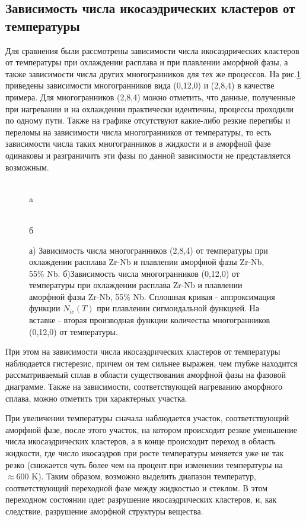 \subsection{Зависимость числа икосаэдрических кластеров от температуры}
Для сравнения были рассмотрены  зависимости  числа икосаэдрических кластеров от температуры при охлаждении расплава и при плавлении аморфной фазы, а также зависимости числа других многогранников для тех же процессов. На  рис.\ref{0120_284}  приведены зависимости многогранников вида (0,12,0) и  (2,8,4) в качестве примера. Для многогранников (2,8,4) можно отметить, что данные, полученные при нагревании и на охлаждении практически идентичны, процессы проходили по одному пути. Также на графике отсутствуют какие-либо резкие перегибы и переломы на зависимости числа многогранников от температуры, то есть зависимости числа таких многогранников в жидкости и в аморфной фазе одинаковы и разграничить эти фазы по данной зависимости не представляется возможным.
\begin{figure}[h!]
	\begin{center}
		\begin{minipage}[h]{0.6\linewidth}
			 \\a 
		\end{minipage}
		\hfill
		\begin{minipage}[h]{0.6\linewidth}
			 \\б
		\end{minipage}
		\caption{а) Зависимость числа многогранников (2,8,4)  от температуры при охлаждении расплава Zr-Nb и плавлении аморфной фазы Zr-Nb, 55\% Nb. 
			б)Зависимость числа многогранников (0,12,0) от температуры при охлаждении расплава Zr-Nb и плавлении аморфной фазы Zr-Nb, 55\% Nb. Сплошная кривая - аппроксимация функции $N_{ic}(T)$ при плавлении сигмоидальной функцией. На вставке - вторая производная функции количества многогранников (0,12,0) от температуры.}
		\label{0120_284}
	\end{center}
\end{figure}
При этом на зависимости числа икосаэдрических кластеров от температуры наблюдается гистерезис, причем он тем сильнее выражен, чем глубже находится рассматриваемый сплав в области существования аморфной фазы на фазовой диаграмме. Также на зависимости, соответствующей нагреванию аморфного сплава, можно отметить три характерных участка.

При  увеличении  температуры сначала наблюдается участок, соответствующий аморфной фазе, после этого участок, на котором происходит  резкое уменьшение числа икосаэдрических кластеров, а в конце  происходит переход в область жидкости, где число икосаэдров при росте температуры меняется уже не так резко (снижается чуть более чем на процент при изменении температуры на $\approx 600\text{ K}$). Таким образом, возможно выделить  диапазон температур, соответствующий переходной фазе между жидкостью и стеклом. В этом переходном состоянии идет разрушение икосаэдрических кластеров, и, как следствие, разрушение аморфной структуры вещества.

